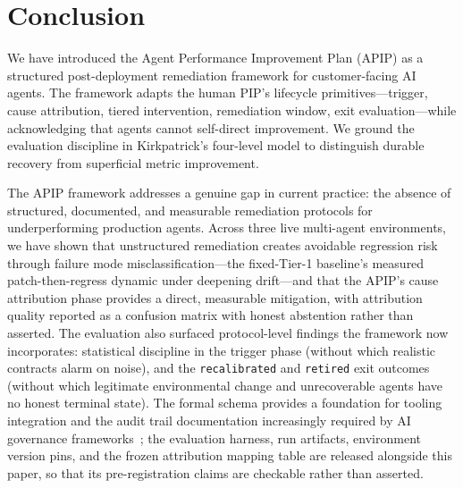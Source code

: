 \section{Conclusion}
\label{sec:conclusion}

We have introduced the Agent Performance Improvement Plan (APIP) as a
structured post-deployment remediation framework for customer-facing AI agents.
The framework adapts the human PIP's lifecycle primitives---trigger, cause
attribution, tiered intervention, remediation window, exit evaluation---while
acknowledging that agents cannot self-direct improvement. We ground the
evaluation discipline in Kirkpatrick's four-level model to distinguish durable
recovery from superficial metric improvement.

The APIP framework addresses a genuine gap in current practice: the absence of
structured, documented, and measurable remediation protocols for
underperforming production agents. Across three live multi-agent
environments, we have shown that unstructured remediation creates avoidable
regression risk through failure mode misclassification---the fixed-Tier-1
baseline's measured patch-then-regress dynamic under deepening drift---and
that the APIP's cause attribution phase provides a direct, measurable
mitigation, with attribution quality reported as a confusion matrix with
honest abstention rather than asserted. The evaluation also surfaced
protocol-level findings the framework now incorporates: statistical
discipline in the trigger phase (without which realistic contracts alarm on
noise), and the \texttt{recalibrated} and \texttt{retired} exit outcomes
(without which legitimate environmental change and unrecoverable agents have
no honest terminal state). The formal schema provides a foundation for
tooling integration and the audit trail documentation increasingly required by
AI governance frameworks~\cite{brundage2020trustworthy,eu2024aiact,wachter2017counterfactual};
the evaluation harness, run artifacts, environment version pins, and the
frozen attribution mapping table are released alongside this paper, so that
its pre-registration claims are checkable rather than asserted.

